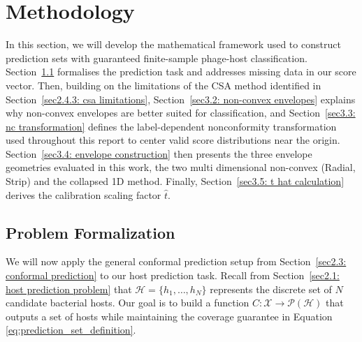 

\chapter{Methodology}
\label{sec3: methodology}

In this section, we will develop the mathematical framework used to construct prediction sets with 
guaranteed finite-sample
phage-host classification. Section~\ref{sec3.1: problem formalisation} formalises the prediction task and addresses 
missing data in our score vector. Then, building on the limitations of the CSA method identified in Section~\ref{sec2.4.3: 
csa limitations}, Section~\ref{sec3.2: non-convex envelopes} explains why non-convex envelopes are better suited for 
classification, and Section~\ref{sec3.3: nc transformation} defines the label-dependent nonconformity transformation 
used throughout this report to center valid score distributions near the origin. Section~\ref{sec3.4: envelope 
construction} then presents the three envelope geometries evaluated in this work, the two multi dimensional non-convex 
(Radial, Strip) and the collapsed 1D method. Finally, Section~\ref{sec3.5: t hat calculation} derives the calibration scaling 
factor $\hat{t}$.

\section{Problem Formalization}
\label{sec3.1: problem formalisation}
We will now apply the general conformal prediction setup from Section~\ref{sec2.3: conformal prediction} to our 
host prediction task. Recall from Section~\ref{sec2.1: host prediction problem} that $\mathcal{H} = \{h_1, \ldots, h_N\}$ 
represents the discrete set of $N$ candidate bacterial hosts. Our goal is to build a function $C: \mathcal{X} \to 
\mathcal{P} (\mathcal{H})$ that outputs a set of hosts while maintaining the coverage guarantee in Equation~
\eqref{eq:prediction_set_definition}.

